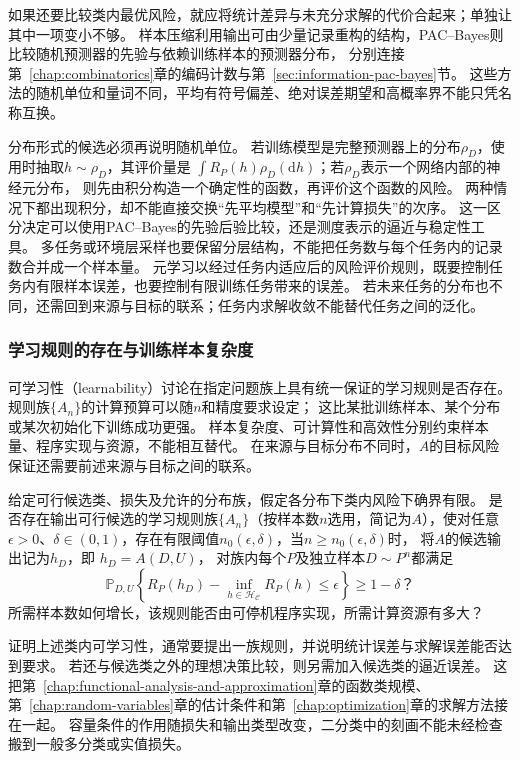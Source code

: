 如果还要比较类内最优风险，就应将统计差异与未充分求解的代价合起来；单独让其中一项变小不够。
样本压缩利用输出可由少量记录重构的结构，PAC--Bayes则比较随机预测器的先验与依赖训练样本的预测器分布，
分别连接第~\ref{chap:combinatorics}章的编码计数与第~\ref{sec:information-pac-bayes}节。
这些方法的随机单位和量词不同，平均有符号偏差、绝对误差期望和高概率界不能只凭名称互换。

分布形式的候选必须再说明随机单位。
若训练模型是完整预测器上的分布$\rho_D$，使用时抽取$h\sim\rho_D$，其评价量是
$\int R_P(h)\rho_D(\mathrm dh)$；若$\rho_D$表示一个网络内部的神经元分布，
则先由积分构造一个确定性的函数，再评价这个函数的风险。
两种情况下都出现积分，却不能直接交换“先平均模型”和“先计算损失”的次序。
这一区分决定可以使用PAC--Bayes的先验后验比较，还是测度表示的逼近与稳定性工具。
多任务或环境层采样也要保留分层结构，不能把任务数与每个任务内的记录数合并成一个样本量。
元学习以经过任务内适应后的风险评价规则，既要控制任务内有限样本误差，也要控制有限训练任务带来的误差。
若未来任务的分布也不同，还需回到来源与目标的联系；任务内求解收敛不能替代任务之间的泛化。

\subsubsection{学习规则的存在与训练样本复杂度}
\label{sec:future-analysis-learnability}

可学习性（learnability）讨论在指定问题族上具有统一保证的学习规则是否存在。
规则族$\{A_n\}$的计算预算可以随$n$和精度要求设定；
这比某批训练样本、某个分布或某次初始化下训练成功更强。
样本复杂度、可计算性和高效性分别约束样本量、程序实现与资源，不能相互替代。
在来源与目标分布不同时，$A$的目标风险保证还需要前述来源与目标之间的联系。

\begin{mathproblem}[具有统一保证的学习规则是否存在]
  \label{question:future-learnability}
  给定可行候选类、损失及允许的分布族，假定各分布下类内风险下确界有限。
  是否存在输出可行候选的学习规则族$\{A_n\}$（按样本数$n$选用，简记为$A$），使对任意
  $\epsilon>0$、$\delta\in(0,1)$，存在有限阈值$n_0(\epsilon,\delta)$，当$n\geq n_0(\epsilon,\delta)$时，
  将$A$的候选输出记为$h_D$，即
  $h_D=A(D,U)$，
  对族内每个$P$及独立样本$D\sim P^n$都满足
  \[
    \mathbb P_{D,U}\!\left\{
      R_P(h_D)-\inf_{h\in\mathcal H_{\mathcal C}}R_P(h)
      \leq\epsilon
    \right\}\geq1-\delta\text{？}
  \]
  所需样本数如何增长，该规则能否由可停机程序实现，所需计算资源有多大？
\end{mathproblem}

证明上述类内可学习性，通常要提出一族规则，并说明统计误差与求解误差能否达到要求。
若还与候选类之外的理想决策比较，则另需加入候选类的逼近误差。
这把第~\ref{chap:functional-analysis-and-approximation}章的函数类规模、
第~\ref{chap:random-variables}章的估计条件和第~\ref{chap:optimization}章的求解方法接在一起。
容量条件的作用随损失和输出类型改变，二分类中的刻画不能未经检查搬到一般多分类或实值损失。

